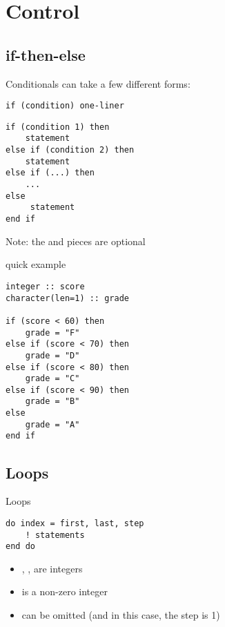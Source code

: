 \section{Control}
\makesubcontentsslides

\subsection{if-then-else}

\begin{frame}[fragile]
  \begin{block}{}\pause
Conditionals can take a few different forms:
\begin{lstlisting}
if (condition) one-liner
\end{lstlisting}
\begin{lstlisting}
if (condition 1) then
    statement
else if (condition 2) then
    statement
else if (...) then
    ...
else
     statement
end if
\end{lstlisting}
Note: the  and  pieces are optional
  \end{block}
\end{frame}

\begin{frame}[fragile]
  \begin{block}{ quick example}\pause
\begin{lstlisting}
integer :: score
character(len=1) :: grade

if (score < 60) then
    grade = "F"
else if (score < 70) then
    grade = "D"
else if (score < 80) then
    grade = "C"
else if (score < 90) then
    grade = "B"
else
    grade = "A"
end if
\end{lstlisting}
  \end{block}
\end{frame}



\subsection{Loops}

\begin{frame}[fragile]
  \begin{block}{ Loops}\pause
\begin{lstlisting}
do index = first, last, step
    ! statements
end do
\end{lstlisting}
  \begin{itemize}
    \item {}, ,  are integers
    \item {} is a non-zero integer
    \item {} can be omitted (and in this case, the step is 1)
  \end{itemize}
  \end{block}
\end{frame}

